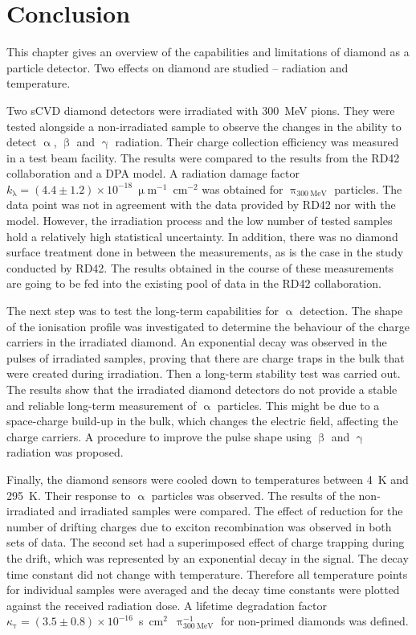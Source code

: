 \clearpage
\section{Conclusion}
\label{sec:radlimit}
This chapter gives an overview of the capabilities and limitations of diamond as a particle detector. Two effects on diamond are studied -- radiation and temperature. 

Two sCVD diamond detectors were irradiated with 300~MeV pions. They were tested alongside a non-irradiated sample to observe the changes in the ability to detect $\upalpha$, $\upbeta$ and $\upgamma$ radiation. Their charge collection efficiency was measured in a test beam facility. The results were compared to the results from the RD42 collaboration and a DPA model. A radiation damage factor $k_{\mathrm{\lambda}}=(4.4\pm1.2)\times10^{-18}~\upmu$m$^{-1}$~cm$^{-2}$ was obtained for $\uppi_{\mathrm{300~MeV}}$ particles. The data point was not in agreement with the data provided by RD42 nor with the model. However, the irradiation process and the low number of tested samples hold a relatively high statistical uncertainty. In addition, there was no diamond surface treatment done in between the measurements, as is the case in the study conducted by RD42. The results obtained in the course of these measurements are going to be fed into the existing pool of data in the RD42 collaboration.

The next step was to test the long-term capabilities for $\upalpha$ detection. The shape of the ionisation profile was investigated to determine the behaviour of the charge carriers in the irradiated diamond. An exponential decay was observed in the pulses of irradiated samples, proving that there are charge traps in the bulk that were created during irradiation. Then a long-term stability test was carried out. The results show that the irradiated diamond detectors do not provide a stable and reliable long-term measurement of $\upalpha$ particles. This might be due to a space-charge build-up in the bulk, which changes the electric field, affecting the charge carriers. A procedure to improve the pulse shape using $\upbeta$ and $\upgamma$ radiation was proposed.

Finally, the diamond sensors were cooled down to temperatures between 4~K and 295~K. Their response to $\upalpha$ particles was observed. The results of the non-irradiated and irradiated samples were compared. The effect of reduction for the number of drifting charges due to exciton recombination was observed in both sets of data. The second set had a superimposed effect of charge trapping during the drift, which was represented by an exponential decay in the signal. The decay time constant did not change with temperature. Therefore all temperature points for individual samples were averaged and the decay time constants were plotted against the received radiation dose. A lifetime degradation factor $\kappa_{\mathrm{\tau}}=(3.5\pm0.8)\times10^{-16}$~s~cm$^2$~$\uppi_{\mathrm{300~MeV}}^{-1}$ for non-primed diamonds was defined.
